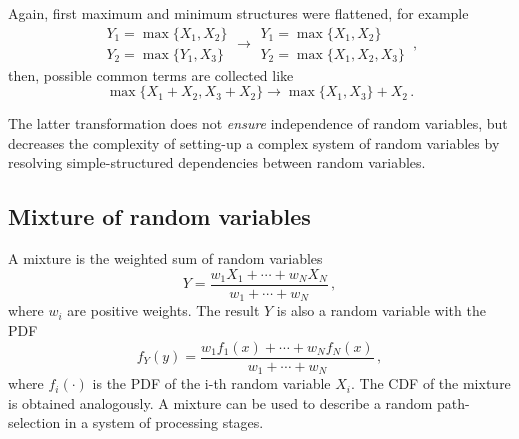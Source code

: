 Again, first maximum and minimum structures were flattened, for example
\begin{equation}
 \begin{array}{l}
  Y_1 = \max\{X_1,X_2\}\\
  Y_2 = \max\{Y_1,X_3\}
 \end{array} \longrightarrow
 \begin{array}{l}
  Y_1 = \max\{X_1,X_2\}\\
  Y_2 = \max\{X_1,X_2,X_3\}
 \end{array}\,, \nonumber
\end{equation}
then, possible common terms are collected like
\begin{equation}
 \max\{X_1 + X_2, X_3 + X_2\} \longrightarrow \max\{X_1,X_3\}+X_2\,. \nonumber
\end{equation}

The latter transformation does not \emph{ensure} independence of random variables, but 
decreases the complexity of setting-up a complex system of random variables by 
resolving simple-structured dependencies between random variables.

\subsection{Mixture of random variables}
A mixture is the weighted sum of random variables
\begin{equation}
 Y = \frac{w_1X_1+\cdots+w_NX_N}{w_1+\cdots+w_N}\,, \nonumber
\end{equation}
where $w_i$ are positive weights. The result $Y$ is also a random variable with the PDF
\begin{equation}
 f_Y(y) = \frac{w_1f_1(x)+\cdots+w_Nf_N(x)}{w_1+\cdots+w_N}\,,\nonumber
\end{equation}
where $f_i(\cdot)$ is the PDF of the i-th random variable $X_i$. The CDF of the
mixture is obtained analogously. A mixture can be used to describe a random 
path-selection in a system of processing stages. 

